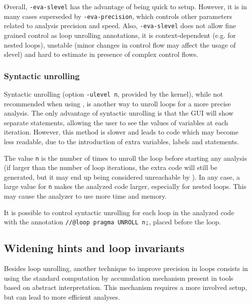 \documentclass{frama-c-book}
\begin{document}
Overall, \lstinline|-eva-slevel| has the advantage of being quick to setup.
However, it is in many cases superseded by \lstinline|-eva-precision|, which
controls other parameters related to analysis precision and speed.
Also, \lstinline|-eva-slevel| does not allow fine grained control as
loop unrolling annotations,
it is context-dependent (e.g. for nested loops), unstable (minor changes in
control flow may affect the usage of slevel) and hard to estimate in presence
of complex control flows.

\subsubsection{Syntactic unrolling}

Syntactic unrolling (option \lstinline|-ulevel n|, provided by the \FramaC
kernel), while not recommended when using \Eva{}, is another way to unroll
loops for a more precise analysis. The only advantage of syntactic unrolling
is that the GUI will show separate statements, allowing
the user to see the values of variables at each iteration.
However, this method is slower and leads to code which may become less
readable, due to the introduction of extra variables, labels and statements.

The value \lstinline$n$ is the number of times to unroll the loop before starting
any analysis (if larger than the number of loop iterations, the extra code will
still be generated, but it may end up being considered unreachable by \Eva{}).
In any case, a large value for \lstinline|n| makes the analyzed code larger,
especially for nested loops. This may cause the analyzer to use more time and
memory.

It is possible to control syntactic unrolling for each loop in the analyzed code
with the annotation \lstinline|//@loop pragma UNROLL n;|, placed before the loop.


\subsection{Widening hints and loop invariants}

Besides loop unrolling, another technique to improve precision in loops
consists in using the standard computation by accumulation mechanism present in
tools based on abstract interpretation. This mechanism requires a more involved
setup, but can lead to more efficient analyses.
\end{document}
